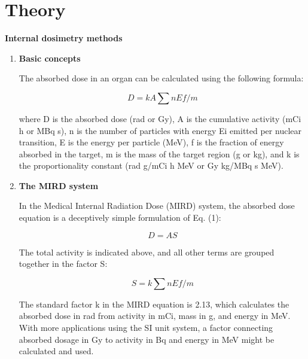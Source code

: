\documentclass[12pt]{article}
\begin{document}
\section{Theory}
\textbf{Internal dosimetry methods}
\begin{enumerate}
 \item  \textbf{Basic concepts} \par The absorbed dose in an organ can be calculated using the following formula: \par
	\begin{equation}
	D = {kA\sum nEf/m} 
	\end{equation}
	\par where D is the absorbed dose (rad or Gy), A is the cumulative activity (mCi h or MBq s), n is the number of particles with energy Ei emitted per nuclear 			transition, E is the energy per particle (MeV), f is the fraction of energy absorbed in the target, m is the mass of the target region (g or kg), and k is 				the proportionality constant (rad g/mCi h MeV or Gy kg/MBq s MeV).
 \item  \textbf{The MIRD system} \par In the Medical Internal Radiation Dose (MIRD) system, the absorbed dose equation is a deceptively simple formulation of Eq. (1): \par
	\begin{equation}
	D = AS
	\end{equation} \par
The total activity is indicated above, and all other terms are grouped together in the factor S: \par
	\begin{equation}
	S = {k\sum nEf/m} 
	\end{equation} \par
The standard factor k in the MIRD equation is 2.13, which calculates the absorbed dose in rad from activity in mCi, mass in g, and energy in MeV. With more applications using the SI unit system, a factor connecting absorbed dosage in Gy to activity in Bq and energy in MeV might be calculated and used.

\end{enumerate}
\end{document}
